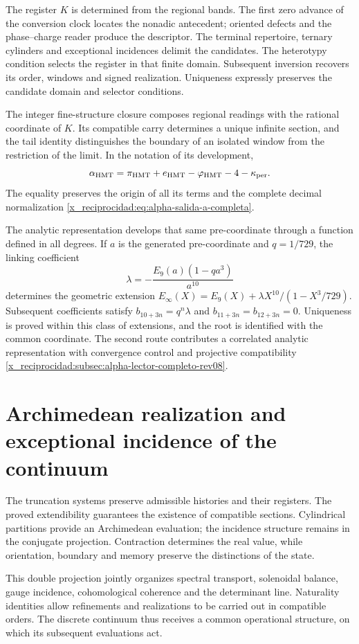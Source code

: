 The register \(K\) is determined from the regional bands. The first zero advance of the conversion clock locates the nonadic antecedent; oriented defects and the phase--charge reader produce the descriptor. The terminal repertoire, ternary cylinders and exceptional incidences delimit the candidates. The heterotypy condition selects the register in that finite domain. Subsequent inversion recovers its order, windows and signed realization. Uniqueness expressly preserves the candidate domain and selector conditions.

The integer fine-structure closure composes regional readings with the rational coordinate of \(K\). Its compatible carry determines a unique infinite section, and the tail identity distinguishes the boundary of an isolated window from the restriction of the limit. In the notation of its development,
\[
 \alpha_{\rm HMT}
 =\pi_{\rm HMT}+e_{\rm HMT}-\varphi_{\rm HMT}
  -4-\kappa_{\rm per}.
\]
The equality preserves the origin of all its terms and the complete decimal normalization \eqref{x_reciprocidad:eq:alpha-salida-a-completa}.

The analytic representation develops that same pre-coordinate through a function defined in all degrees. If \(a\) is the generated pre-coordinate and \(q=1/729\), the linking coefficient
\[
 \lambda=-\frac{E_9(a)(1-qa^3)}{a^{10}}
\]
determines the geometric extension \(E_\infty(X)=E_9(X)+\lambda X^{10}/(1-X^3/729)\). Subsequent coefficients satisfy \(b_{10+3n}=q^n\lambda\) and \(b_{11+3n}=b_{12+3n}=0\). Uniqueness is proved within this class of extensions, and the root is identified with the common coordinate. The second route contributes a correlated analytic representation with convergence control and projective compatibility \ref{x_reciprocidad:subsec:alpha-lector-completo-rev08}.

\section{Archimedean realization and exceptional incidence of the continuum}

The truncation systems preserve admissible histories and their registers. The proved extendibility guarantees the existence of compatible sections. Cylindrical partitions provide an Archimedean evaluation; the incidence structure remains in the conjugate projection. Contraction determines the real value, while orientation, boundary and memory preserve the distinctions of the state.

This double projection jointly organizes spectral transport, solenoidal balance, gauge incidence, cohomological coherence and the determinant line. Naturality identities allow refinements and realizations to be carried out in compatible orders. The discrete continuum thus receives a common operational structure, on which its subsequent evaluations act.

